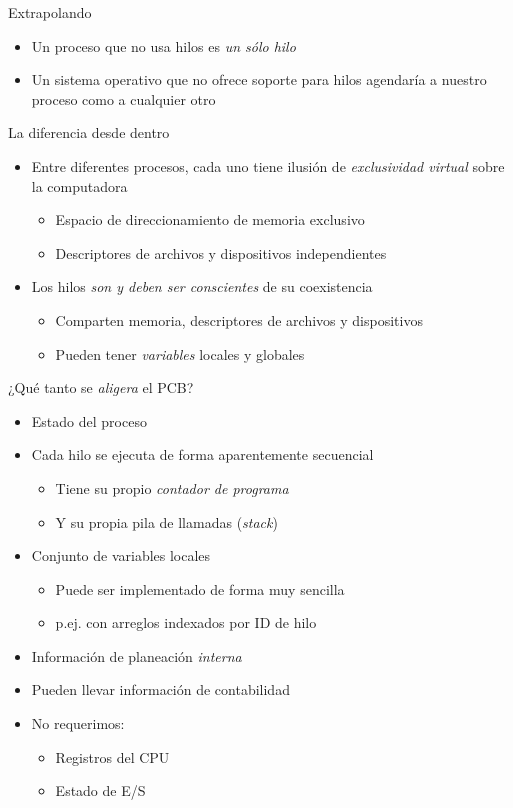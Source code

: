 \documentclass[presentation]{beamer}
\begin{document}
\begin{frame}[label={sec:orgb537ccf}]{Extrapolando}
\begin{itemize}
\item Un proceso que no usa hilos es \emph{un sólo hilo}
\item Un sistema operativo que no ofrece soporte para hilos agendaría a
nuestro proceso como a cualquier otro
\end{itemize}
\end{frame}

\begin{frame}[label={sec:org7ce10d2}]{La diferencia desde dentro}
\begin{itemize}
\item Entre diferentes procesos, cada uno tiene ilusión de \emph{exclusividad
virtual} sobre la computadora
\begin{itemize}
\item Espacio de direccionamiento de memoria exclusivo
\item Descriptores de archivos y dispositivos independientes
\end{itemize}
\item Los hilos \emph{son y deben ser conscientes} de su coexistencia
\begin{itemize}
\item Comparten memoria, descriptores de archivos y dispositivos
\item Pueden tener \emph{variables} locales y globales
\end{itemize}
\end{itemize}
\end{frame}

\begin{frame}[label={sec:org26ee20b}]{¿Qué tanto se \emph{aligera} el PCB?}
\begin{itemize}
\item Estado del proceso
\item Cada hilo se ejecuta de forma aparentemente secuencial
\begin{itemize}
\item Tiene su propio \emph{contador de programa}
\item Y su propia pila de llamadas (\emph{stack})
\end{itemize}
\item Conjunto de variables locales
\begin{itemize}
\item Puede ser implementado de forma muy sencilla
\item p.ej. con arreglos indexados por ID de hilo
\end{itemize}
\item Información de planeación \emph{interna}
\item Pueden llevar información de contabilidad
\item No requerimos:
\begin{itemize}
\item Registros del CPU
\item Estado de E/S
\end{itemize}
\end{itemize}
\end{frame}
\end{document}
